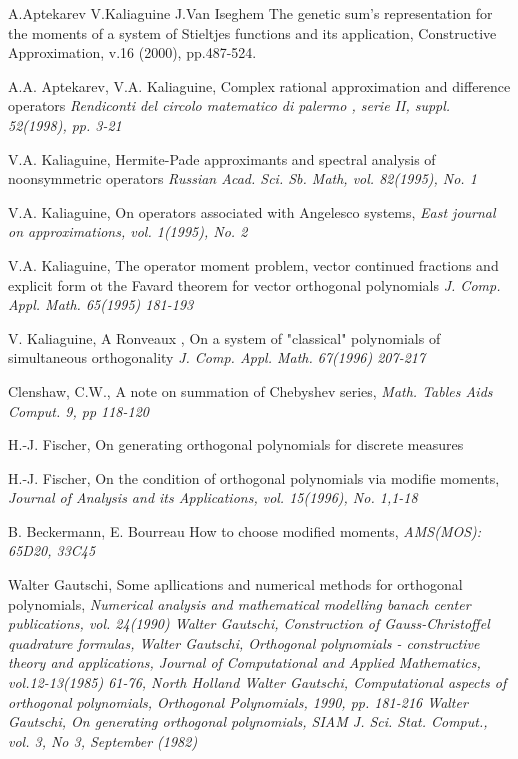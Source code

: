 \begin{thebibliography}{99}

 A.Aptekarev V.Kaliaguine J.Van Iseghem
The genetic sum's representation for the moments of a system of
Stieltjes functions and its application, Constructive
Approximation, v.16 (2000), pp.487-524.

 A.A. Aptekarev, V.A. Kaliaguine,
Complex rational approximation and difference operators \it
Rendiconti del circolo matematico di palermo \rm , serie II,
suppl. 52(1998), pp. 3-21

 V.A. Kaliaguine, Hermite-Pade approximants and spectral analysis of noonsymmetric operators
\it Russian Acad. Sci. Sb. Math, \rm  vol. 82(1995), No. 1

 V.A. Kaliaguine, On operators associated with Angelesco systems,
\it East journal on approximations, \rm vol. 1(1995), No. 2

 V.A. Kaliaguine, The operator moment problem,
vector continued fractions and explicit form ot the Favard theorem
for vector orthogonal polynomials \it J. Comp. Appl. Math. \rm
65(1995) 181-193

 V. Kaliaguine, A Ronveaux , On a system of "classical" polynomials of simultaneous orthogonality \it J. Comp. Appl. Math. \rm
67(1996) 207-217

 Clenshaw, C.W., A note on summation of
Chebyshev series, \it Math. Tables Aids Comput. \rm 9, pp 118-120

 H.-J. Fischer, On generating orthogonal polynomials for discrete measures

 H.-J. Fischer, On the condition of orthogonal polynomials via modifie moments,
\it Journal of Analysis and its Applications, \rm vol. 15(1996),
No. 1,1-18

 B. Beckermann, E. Bourreau How to choose modified moments,
\it AMS(MOS): 65D20, 33C45 \rm

 Walter Gautschi, Some apllications and numerical methods for orthogonal polynomials,
\it Numerical analysis and mathematical modelling banach center
publications, \rm vol. 24(1990)
 Walter Gautschi, Construction of Gauss-Christoffel quadrature formulas,
 Walter Gautschi, Orthogonal polynomials - constructive theory and applications,
\it Journal of Computational and Applied Mathematics, \rm
vol.12-13(1985) 61-76, North Holland
 Walter Gautschi, Computational aspects of orthogonal polynomials,
\it Orthogonal Polynomials, \rm  1990, pp. 181-216
 Walter Gautschi, On generating orthogonal polynomials,
\it SIAM J. Sci. Stat. Comput., \rm vol. 3, No 3, September (1982)



\end{thebibliography}
